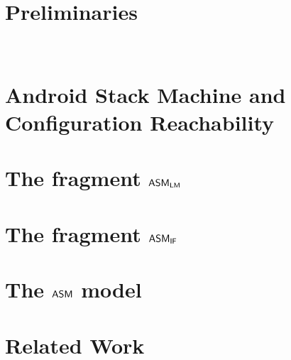 \documentclass[preprint,12pt]{elsarticle}
\begin{document}
\section{Preliminaries}~\label{sec:prel}



\section{Android Stack Machine and Configuration Reachability} \label{sec:amass}



 

\section{The fragment $\textsf{ASM}_\textsf{LM}$}\label{sec:reach-lmamass}



\section{The fragment $\textsf{ASM}_\textsf{IF}$}\label{sec:reach-ifamass}




\section{The $\textsf{ASM}$ model}\label{sec:reach-amass}






\section{Related Work}
%


\end{document}

